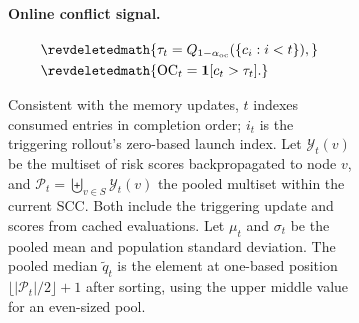 \documentclass[11pt]{article}
\begin{document}
\begin{figure}[!t]
\begin{figure}[!t]
\paragraph{Online conflict signal.}
\ifrevisionmarks
\[
    \begin{aligned}
    &\revdeletedmath{\tau_t=Q_{1-\alpha_{\mathrm{oc}}}(\{c_i:i<t\}),}\\
    &\revdeletedmath{\operatorname{OC}_t=\mathbf{1}[c_t>\tau_t].}
    \end{aligned}
\]
\fi
\begin{revadded}
Consistent with the memory updates, $t$ indexes consumed entries in completion order; $i_t$ is the triggering rollout's zero-based launch index. Let $\mathcal Y_t(v)$ be the multiset of risk scores backpropagated to node $v$, and $\mathcal P_t=\biguplus_{v\in S}\mathcal Y_t(v)$ the pooled multiset within the current SCC. Both include the triggering update and scores from cached evaluations. Let $\mu_t$ and $\sigma_t$ be the pooled mean and population standard deviation. The pooled median $\tilde q_t$ is the element at one-based position $\lfloor|\mathcal P_t|/2\rfloor+1$ after sorting, using the upper middle value for an even-sized pool.


\end{revadded}
\end{figure}
\end{figure}
\end{document}
